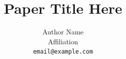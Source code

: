 \documentclass[11pt]{article}
\title{Paper Title Here}
\author{Author Name\\Affiliation\\\texttt{email@example.com}}
\date{}
\theoremstyle{plain}
\theoremstyle{definition}
\theoremstyle{remark}
\begin{document}
\maketitle

\begin{abstract}

\end{abstract}








\clearpage
\appendix

\end{document}

